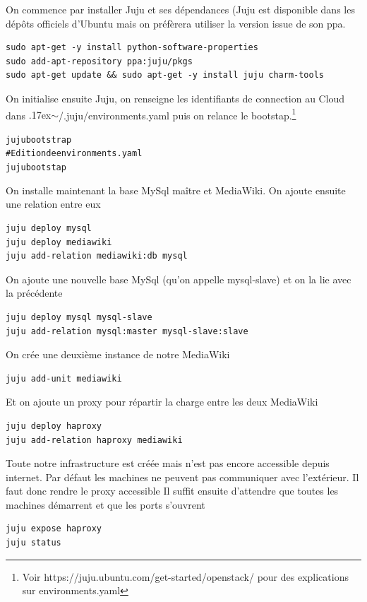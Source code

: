 \documentclass[a4paper,oneside]{report}
\begin{document}
On commence par installer Juju et ses dépendances (Juju est disponible dans les dépôts officiels d'Ubuntu mais on préfèrera utiliser la version issue de son \gls{ppa}.
\begin{verbatim}
sudo apt-get -y install python-software-properties
sudo add-apt-repository ppa:juju/pkgs
sudo apt-get update && sudo apt-get -y install juju charm-tools
\end{verbatim}

On initialise ensuite Juju, on renseigne les identifiants de connection au Cloud dans {\raise.17ex\hbox{$\scriptstyle\sim$}}/.juju/environments.yaml puis on relance le bootstap.\footnote{Voir https://juju.ubuntu.com/get-started/openstack/ pour des explications sur environments.yaml}
\begin{alltt}
juju bootstrap
# Edition de environments.yaml
juju bootstap
\end{alltt}

On installe maintenant la base MySql maître et MediaWiki. On ajoute ensuite une relation entre eux
\begin{verbatim}
juju deploy mysql
juju deploy mediawiki
juju add-relation mediawiki:db mysql
\end{verbatim}

On ajoute une nouvelle base MySql (qu'on appelle mysql-slave) et on la lie avec la précédente
\begin{verbatim}
juju deploy mysql mysql-slave
juju add-relation mysql:master mysql-slave:slave
\end{verbatim}

On crée une deuxième instance de notre MediaWiki
\begin{verbatim}
juju add-unit mediawiki
\end{verbatim}


Et on ajoute un proxy pour répartir la charge entre les deux MediaWiki
\begin{verbatim}
juju deploy haproxy
juju add-relation haproxy mediawiki
\end{verbatim}

Toute notre infrastructure est créée mais n'est pas encore accessible depuis internet. 
Par défaut les machines ne peuvent pas communiquer avec l'extérieur. Il faut donc rendre le proxy accessible
Il suffit ensuite d'attendre que toutes les machines démarrent et que les ports s'ouvrent
\begin{verbatim}
juju expose haproxy
juju status
\end{verbatim}
\end{document}
